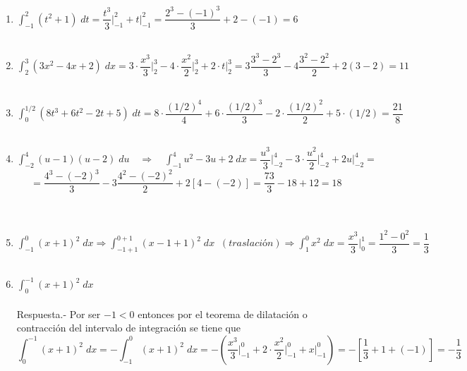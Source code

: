\begin{enumerate}
    \item $\displaystyle\int_{-1}^2 (t^2 + 1)\; dt = \dfrac{t^3}{3}\bigg|_{-1}^{2} + t\bigg|_{-1}^2 = \dfrac{2^3 - (-1)^3}{3} + 2 - (-1) = 6$\\\\

    \item $\displaystyle\int_2^3 (3x^2 - 4x + 2) \; dx = 3\cdot \dfrac{x^3}{3}\bigg|_2^3 - 4\cdot \dfrac{x^2}{2}\bigg|_2^3 + 2\cdot t\bigg|_2^3 = 3\dfrac{3^3-2^3}{3} - 4\dfrac{3^2-2^2}{2} + 2(3-2) = 11$\\\\

    \item $\displaystyle\int_0^{1/2} (8t^3 + 6 t^2 - 2t +5)\; dt  = 8\cdot \dfrac{(1/2)^4}{4} + 6\cdot\dfrac{(1/2)^3}{3} - 2\cdot \dfrac{(1/2)^2}{2} + 5\cdot (1/2) = \dfrac{21}{8} $\\\\

    \item $\displaystyle\int_{-2}^4 (u-1)(u-2)\; du \quad \Longrightarrow \quad \int_{-1}^4 u^2 - 3u + 2\; dx = \dfrac{u^3}{3}\bigg|_{-2}^4 - 3\cdot \dfrac{u^2}{2}\bigg|_{-2}^4 + 2u\bigg|_{-2}^4 = $ $$=\dfrac{4^3 - (-2)^3}{3}-3\dfrac{4^2 - (-2)^2}{2} + 2[4 - (-2)] = \dfrac{73}{3} - 18 + 12 = 18$$\\\\

    \item $\displaystyle\int_{-1}^0 (x+1)^2 \; dx \Longrightarrow \int_{-1+1}^{0+1} (x-1+1)^2 \; dx \; \;(traslación)  \Longrightarrow  \int_{1}^0 x^2 \; dx = \dfrac{x^3}{3}\bigg|_0^1 = \dfrac{1^2 - 0^2}{3} =\dfrac{1}{3}$\\\\

    \item $\displaystyle\int_0^{-1} (x+1)^2\; dx$\\\\
	Respuesta.-\; Por ser $-1<0$ entonces por el teorema de dilatación o contracción del intervalo de integración se tiene que $$\int_{0}^{-1} (x+1)^2\; dx = -\int_{-1}^0 (x+1)^2 \; dx = - \left( \dfrac{x^3}{3}\bigg|_{-1}^0 + 2\cdot \dfrac{x^2}{2}\bigg|_{-1}^0 + x \bigg|_{-1}^0 \right) = - \left[\dfrac{1}{3} + 1 + (-1)\right]  = - \dfrac{1}{3}$$\\


\end{enumerate}
